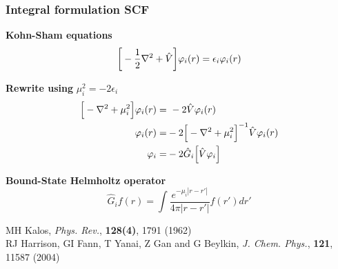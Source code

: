 \begin{frame}
    \frametitle{Integral formulation SCF}
    \centering
    \textbf{Kohn-Sham equations}
    \begin{equation}
	\nonumber
	\bigg[-\frac{1}{2}\nabla^2 + \hat{V}\bigg]\varphi_i(r) = \epsilon_i \varphi_i(r)
    \end{equation}

    \vspace{5mm}

    \textbf{Rewrite using} $\mu_i^2 = -2\epsilon_i$
    \begin{align}
	\nonumber
	\Big[-\nabla^2 + \mu_i^2\Big]\orbital_i(r) =&\ -2\hat{V}\orbital_i(r)\\
	\nonumber
	\orbital_i(r) =&-2\Big[-\nabla^2 + \mu_i^2\Big]^{-1}\hat{V}\orbital_i(r)\\
	\nonumber
	\orbital_i =&-2\hat{G}_i\Big[\hat{V}\orbital_i\Big]
    \end{align}

    \vspace{5mm}

    \textbf{Bound-State Helmholtz operator}
    \begin{equation}
	\nonumber
	\hat{G}_if(r) = \int \frac{e^{-\mu_i |r-r'|}}{4\pi|r-r'|}f(r')dr'
    \end{equation}

    \vspace{5mm}

    \centering
    \tiny
    MH Kalos,
    {\it Phys. Rev.}, 
    \textbf{128(4)},
    1791 (1962)\\
    RJ Harrison, GI Fann, T Yanai, Z Gan and G Beylkin,
    {\it J. Chem. Phys.}, 
    \textbf{121},
    11587 (2004)
\end{frame}

